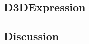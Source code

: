 \documentclass[10pt,twocolumn,letterpaper]{article}
\begin{document}
\subsection{D3DExpression}

\subsection{Discussion}

{\small



}
\end{document}
